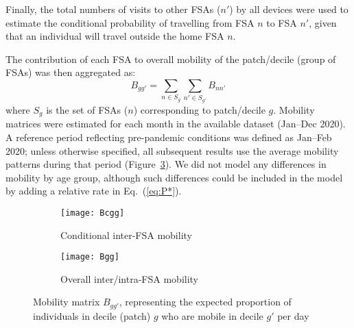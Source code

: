 Finally, the total numbers of visits to other FSAs ($n'$) by all devices were used to estimate
the conditional probability of travelling from FSA $n$ to FSA $n'$,
given that an individual will travel outside the home FSA $n$.
\par
The contribution of each FSA to overall mobility of the patch/decile (group of FSAs)
was then aggregated as:
\begin{equation}\label{eq:Bgg}
  B_{gg'} = \sum_{n \in S_g}\sum_{n' \in S_{g'}} B_{nn'}
\end{equation}
where $S_g$ is the set of FSAs ($n$) corresponding to patch/decile $g$.
Mobility matrices were estimated for each month in the available dataset (Jan--Dec 2020).
A reference period reflecting pre-pandemic conditions was defined as Jan--Feb 2020;
unless otherwise specified, all subsequent results use the average mobility patterns during that period
(Figure~\ref{fig:Bgg}).
We did not model any differences in mobility by age group,
although such differences could be included in the model by adding a relative rate in Eq.~(\ref{eq:P*}).
\begin{figure}
  \centering
  \begin{subfigure}{0.49\linewidth}
    \texttt{[image: Bcgg]}
    \caption{Conditional inter-FSA mobility}
    \label{fig:Bggo}
  \end{subfigure}\hfill%
  \begin{subfigure}{0.49\linewidth}
    \texttt{[image: Bgg]}
    \caption{Overall inter/intra-FSA mobility}
    \label{fig:Bggd}
  \end{subfigure}
  \caption{Mobility matrix $B_{gg'}$, representing
    the expected proportion of individuals in decile (patch) $g$
    who are mobile in decile $g'$ per day}
  \label{fig:Bgg}
\end{figure}
